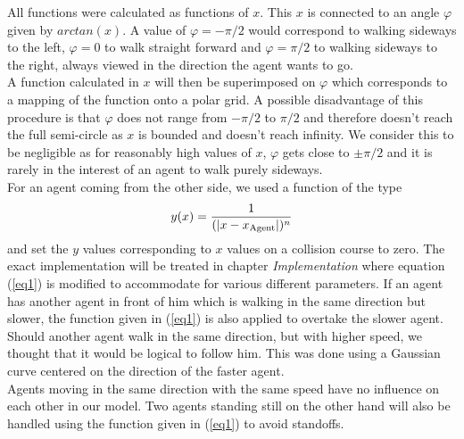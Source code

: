 \noi All functions were calculated as functions of $x$. This $x$ is connected to an angle $\varphi$ given by $arctan(x)$. A value of $\varphi = -\pi/2$ would correspond to walking sideways to the left, $\varphi = 0$ to walk straight forward and $\varphi = \pi/2$ to walking sideways to the right, always viewed in the direction the agent wants to go.\\
A function calculated in $x$ will then be superimposed on $\varphi$ which corresponds to a mapping of the function onto a polar grid. A possible disadvantage of this procedure is that $\varphi$ does not range from $-\pi/2$ to $\pi/2$ and therefore doesn't reach the full semi-circle as $x$ is bounded and doesn't reach infinity. We consider this to be negligible as for reasonably high values of $x$, $\varphi$ gets close to $\pm \pi/2$ and it is rarely in the interest of an agent to walk purely sideways.\\

\noi For an agent coming from the other side, we used a function of the type
\begin{equation}\label{eq1}
	y(x) = \frac{1}{(|x-x_{\text{Agent}}|)^n}
\end{equation}
\noi and set the $y$ values corresponding to $x$ values on a collision course to zero. The exact implementation will be treated in chapter \textit{Implementation} where equation (\ref{eq1}) is modified to accommodate for various different parameters. If an agent has another agent in front of him which is walking in the same direction but slower, the function given in (\ref{eq1}) is also applied to overtake the slower agent.\\
Should another agent walk in the same direction, but with higher speed, we thought that it would be logical to follow him. This was done using a Gaussian curve centered on the direction of the faster agent.\\
Agents moving in the same direction with the same speed have no influence on each other in our model. Two agents standing still on the other hand will also be handled using the function given in (\ref{eq1}) to avoid standoffs.

